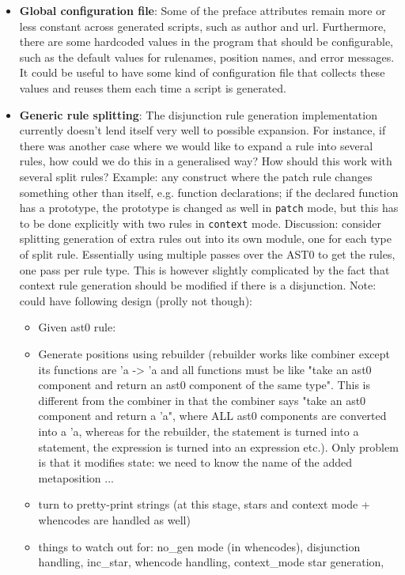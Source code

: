 \begin{itemize}
\item \textbf{Global configuration file}: Some of the preface attributes remain more or less constant across generated scripts, such as author and url. Furthermore, there are some hardcoded values in the program that should be configurable, such as the default values for rulenames, position names, and error messages.\newline
It could be useful to have some kind of configuration file that collects these values and reuses them each time a script is generated.
\item \textbf{Generic rule splitting}: The disjunction rule generation implementation currently doesn't lend itself very well to possible expansion. For instance, if there was another case where we would like to expand a rule into several rules, how could we do this in a generalised way? How should this work with several split rules?\newline
Example: any construct where the patch rule changes something other than itself, e.g. function declarations; if the declared function has a prototype, the prototype is changed as well in \texttt{patch} mode, but this has to be done explicitly with two rules in \texttt{context} mode.\newline
Discussion: consider splitting generation of extra rules out into its own module, one for each type of split rule. Essentially using multiple passes over the AST0 to get the rules, one pass per rule type. This is however slightly complicated by the fact that context rule generation should be modified if there is a disjunction.\newline
Note: could have following design (prolly not though):
\begin{itemize}
\item Given ast0 rule:
\item Generate positions using rebuilder (rebuilder works like combiner except its functions are 'a -> 'a and all functions must be like "take an ast0 component and return an ast0 component of the same type". This is different from the combiner in that the combiner says "take an ast0 component and return a 'a", where ALL ast0 components are converted into a 'a, whereas for the rebuilder, the statement is turned into a statement, the expression is turned into an expression etc.). Only problem is that it modifies state: we need to know the name of the added metaposition ...

\item turn to pretty-print strings (at this stage, stars and context mode + whencodes are handled as well)
\item things to watch out for: no\_gen mode (in whencodes), disjunction handling, inc\_star, whencode handling, context\_mode star generation, 



\end{itemize}
\end{itemize}
